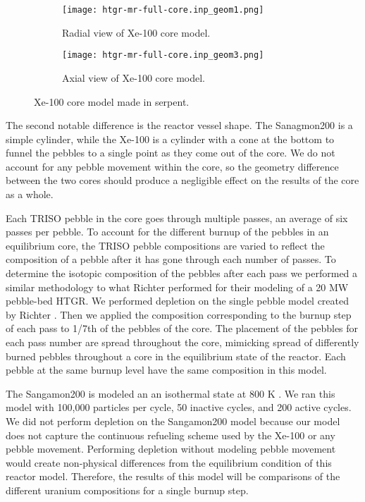 \begin{figure}[ht]
    \centering 
    \begin{subfigure}{0.45\textwidth}
        \centering 
        \texttt{[image: htgr-mr-full-core.inp\_geom1.png]}
        \caption{Radial view of Xe-100 core model.}
        \label{fig:xe100_core_radial}        
    \end{subfigure}
    \hfill
    \begin{subfigure}{0.45\textwidth}
        \centering 
        \texttt{[image: htgr-mr-full-core.inp\_geom3.png]}
        \caption{Axial view of Xe-100 core model.}
        \label{fig:xe100_core_axial}        
    \end{subfigure}
    \caption{Xe-100 core model made in serpent.}
    \label{fig:xe100_core}
\end{figure}

The second 
notable difference is the reactor vessel shape. The Sanagmon200 is a simple 
cylinder, while the Xe-100 is a cylinder with a cone at the bottom to funnel 
the pebbles to a single point as they come out of the core. We do not account 
for any pebble movement within the core, so the geometry difference between 
the two cores should produce a negligible effect on the results of the 
core as a whole.

Each \gls{TRISO} pebble in the core goes through multiple passes, an average 
of six passes per pebble. To account for the different burnup of 
the pebbles in an equilibrium core, the \gls{TRISO} pebble compositions are 
varied to reflect the composition of a pebble after it has gone through 
each number of passes. To determine the isotopic composition of the 
pebbles after each pass we performed a similar methodology to what
Richter performed for their modeling of a 20 MW pebble-bed \gls{HTGR}. 
We performed depletion on the single pebble model 
created by Richter \cite{richter_zoerichterphlox_2022}. Then we 
applied the composition corresponding to the burnup step of each pass 
to 1/7th of the pebbles of the core. The placement of the pebbles for 
each pass number are spread throughout the core, mimicking spread of 
differently burned pebbles throughout a core in the equilibrium state 
of the reactor. Each pebble at the same burnup level have the same 
composition in this model.   

The Sangamon200 is modeled an an isothermal state at 800 K \cite{richter_isotopic_2022}.
We ran this model with 100,000 particles per cycle, 50 inactive cycles, 
and 200 active cycles. We did not perform depletion on the Sangamon200 model 
because our model 
does not capture the continuous refueling scheme used by the Xe-100 or 
any pebble movement. Performing depletion without modeling pebble movement 
would create non-physical differences from the equilibrium condition of 
this reactor model. Therefore, the results of this model will be comparisons
of the different uranium compositions for a single burnup step.

